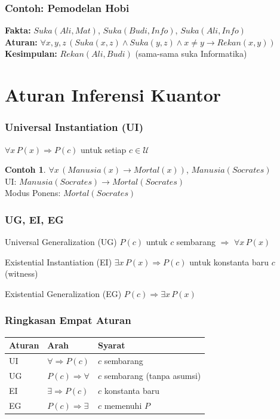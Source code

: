 \documentclass[handout]{beamer}
\theoremstyle{definition}
\theoremstyle{example}
\newtheorem{contoh}[theorem]{Contoh}
\begin{document}
\begin{frame}
\frametitle{Contoh: Pemodelan Hobi}
\textbf{Fakta:} $Suka(Ali, Mat)$, $Suka(Budi, Info)$, $Suka(Ali, Info)$\\
\textbf{Aturan:} $\forall x,y,z\, (Suka(x,z) \wedge Suka(y,z) \wedge x \neq y \rightarrow Rekan(x,y))$\\
\textbf{Kesimpulan:} $Rekan(Ali, Budi)$ (sama-sama suka Informatika)
\end{frame}

\section{Aturan Inferensi Kuantor}

\begin{frame}
\frametitle{Universal Instantiation (UI)}
$\forall x\, P(x) \Rightarrow P(c)$ untuk setiap $c \in \mathcal{U}$
\begin{contoh}
$\forall x\, (Manusia(x) \rightarrow Mortal(x))$, $Manusia(Socrates)$\\
UI: $Manusia(Socrates) \rightarrow Mortal(Socrates)$\\
Modus Ponens: $Mortal(Socrates)$
\end{contoh}
\end{frame}

\begin{frame}
\frametitle{UG, EI, EG}
\begin{block}{Universal Generalization (UG)}
$P(c)$ untuk $c$ sembarang $\Rightarrow$ $\forall x\, P(x)$
\end{block}
\begin{block}{Existential Instantiation (EI)}
$\exists x\, P(x) \Rightarrow P(c)$ untuk konstanta baru $c$ (witness)
\end{block}
\begin{block}{Existential Generalization (EG)}
$P(c) \Rightarrow \exists x\, P(x)$
\end{block}
\end{frame}

\begin{frame}
\frametitle{Ringkasan Empat Aturan}
\begin{center}
\small
\begin{tabular}{|l|l|l|}
\hline
\textbf{Aturan} & \textbf{Arah} & \textbf{Syarat} \\ \hline
UI & $\forall \Rightarrow P(c)$ & $c$ sembarang \\ \hline
UG & $P(c) \Rightarrow \forall$ & $c$ sembarang (tanpa asumsi) \\ \hline
EI & $\exists \Rightarrow P(c)$ & $c$ konstanta baru \\ \hline
EG & $P(c) \Rightarrow \exists$ & $c$ memenuhi $P$ \\ \hline
\end{tabular}
\end{center}
\end{frame}
\end{document}
